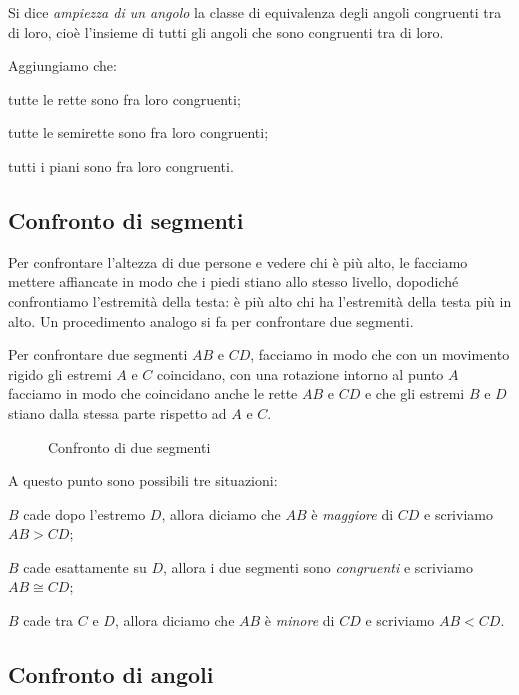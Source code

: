 \begin{definizione}
Si dice \emph{ampiezza di un angolo} la classe di equivalenza degli angoli congruenti tra di loro, cioè l'insieme di tutti gli angoli che sono congruenti tra di loro.
\end{definizione}

Aggiungiamo che:
\begin{itemize*}
\item tutte le rette sono fra loro congruenti;
\item tutte le semirette sono fra loro congruenti;
\item tutti i piani sono fra loro congruenti.
\end{itemize*}

\subsection{Confronto di segmenti}

Per confrontare l'altezza di due persone e vedere chi è più alto, le facciamo mettere affiancate in modo che i piedi stiano allo stesso livello, dopodiché confrontiamo l'estremità della testa: è più alto chi ha l'estremità della testa più in alto. Un procedimento analogo si fa per confrontare due segmenti.

Per confrontare due segmenti $AB$ e $CD$, facciamo in modo che con un movimento rigido gli estremi $A$ e $C$ coincidano, con una rotazione intorno al punto $A$ facciamo in  modo che coincidano anche le rette $AB$ e $CD$ e che gli estremi $B$ e $D$ stiano dalla stessa parte rispetto ad $A$ e $C$.

\begin{figure}[htb]
\centering
\caption{Confronto di due segmenti}
\end{figure}

A questo punto sono possibili tre situazioni:
\begin{itemize*}
\item $B$ cade dopo l'estremo $D$, allora diciamo che $AB$ è \emph{maggiore} di $CD$ e scriviamo $AB>CD$;
\item $B$ cade esattamente su $D$, allora i due segmenti sono \emph{congruenti} e scriviamo $AB\cong CD$;
\item $B$ cade tra $C$ e $D$, allora diciamo che $AB$ è \emph{minore} di $CD$ e scriviamo $AB<CD$.
\end{itemize*}

\subsection{Confronto di angoli}

